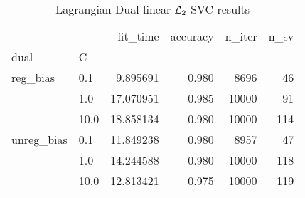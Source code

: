 \begin{table}[H]
\centering
\caption{Lagrangian Dual linear $\protect \mathcal{L}_2$-SVC results}
\label{linear_lagrangian_dual_l2_svc_cv_results}
\begin{tabular}{llrrrr}
\toprule
           &      &   fit\_time &  accuracy &  n\_iter &  n\_sv \\
dual & C &            &           &         &       \\
\midrule
reg\_bias & 0.1  &   9.895691 &     0.980 &    8696 &    46 \\
           & 1.0  &  17.070951 &     0.985 &   10000 &    91 \\
           & 10.0 &  18.858134 &     0.980 &   10000 &   114 \\
unreg\_bias & 0.1  &  11.849238 &     0.980 &    8957 &    47 \\
           & 1.0  &  14.244588 &     0.980 &   10000 &   118 \\
           & 10.0 &  12.813421 &     0.975 &   10000 &   119 \\
\bottomrule
\end{tabular}
\end{table}
